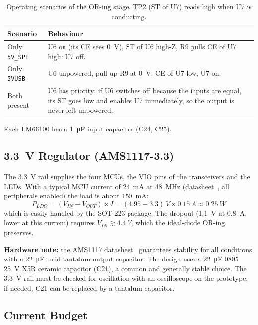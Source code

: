 \documentclass[11pt,a4paper]{article}
\newcommand{\net}[1]{\texttt{#1}}
\begin{document}
\begin{table}[H]
\centering
\begin{tabular}{l>{\raggedright\arraybackslash}p{}}
\toprule
Scenario & Behaviour \\
\midrule
Only \net{5V\_SPI} & U6 on (its CE sees \qty{0}{V}), ST of U6 high-Z, R9 pulls CE of U7 high: U7 off. \\
Only \net{5VUSB} & U6 unpowered, pull-up R9 at \qty{0}{V}: CE of U7 low, U7 on. \\
Both present & U6 has priority; if U6 switches off because the inputs are equal, its ST goes
low and enables U7 immediately, so the output is never left unpowered. \\
\bottomrule
\end{tabular}
\caption{Operating scenarios of the OR-ing stage. TP2 (ST of U7) reads high when U7 is
conducting.}
\label{tab:oring}
\end{table}

Each LM66100 has a \qty{1}{\micro F} input capacitor (C24, C25).

\subsection{\texorpdfstring{\qty{3.3}{V}}{3.3 V} Regulator (AMS1117-3.3)}

The \qty{3.3}{V} rail supplies the four MCUs, the VIO pins of the transceivers and the LEDs. With
a typical MCU current of \qty{24}{mA} at \qty{48}{MHz} (datasheet~\cite{stm32}, all peripherals enabled) the load is
about \qty{150}{mA}:
\begin{equation}
P_{LDO} = (V_{IN} - V_{OUT}) \times I = (4.95 - 3.3)\,\unit{V} \times \qty{0.15}{A} \approx \qty{0.25}{W}
\end{equation}
which is easily handled by the SOT-223 package. The dropout (\qty{1.1}{V} at \qty{0.8}{A}, lower at this
current) requires $V_{IN} \gtrsim \qty{4.4}{V}$, which the ideal-diode OR-ing preserves.

\textbf{Hardware note:} the AMS1117 datasheet~\cite{ams1117} guarantees stability for all conditions with a
\qty{22}{\micro F} solid tantalum output capacitor. The design uses a \qty{22}{\micro F} 0805 \qty{25}{V} X5R ceramic capacitor
(C21), a common and generally stable choice. The \qty{3.3}{V} rail must be checked for oscillation with
an oscilloscope on the prototype; if needed, C21 can be replaced by a tantalum capacitor.

\subsection{Current Budget}\label{sec:budget}
\end{document}
